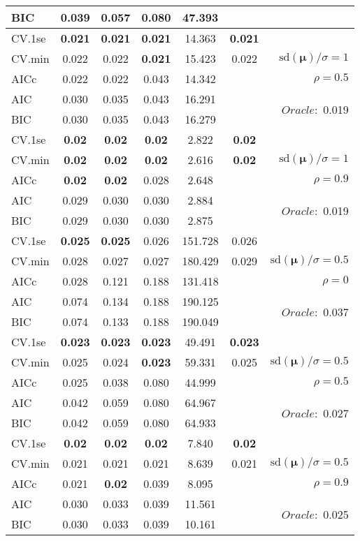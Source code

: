 \begin{table}
\begin{center}
\begin{tabular}{l*{5}{c}|r}
BIC & 0.039 & 0.057 & 0.080 & 47.393 & &  \\
 \hline 
CV.1se & {\bf 0.021} & {\bf 0.021} & {\bf 0.021} & 14.363 & {\bf 0.021} & \\
CV.min & 0.022 & 0.022 & {\bf 0.021} & 15.423 & 0.022 &  $\mathrm{sd}(\mathbf{\mu})/\sigma=1$ \\
AICc & 0.022 & 0.022 & 0.043 & 14.342 & & $\rho=0.5$ \\
AIC & 0.030 & 0.035 & 0.043 & 16.291 & &  \multirow{2}{*}{$Oracle: $ 0.019} \\
BIC & 0.030 & 0.035 & 0.043 & 16.279 & &  \\
 \hline 
CV.1se & {\bf 0.02} & {\bf 0.02} & {\bf 0.02} & 2.822 & {\bf 0.02} & \\
CV.min & {\bf 0.02} & {\bf 0.02} & {\bf 0.02} & 2.616 & {\bf 0.02} &  $\mathrm{sd}(\mathbf{\mu})/\sigma=1$ \\
AICc & {\bf 0.02} & {\bf 0.02} & 0.028 & 2.648 & & $\rho=0.9$ \\
AIC & 0.029 & 0.030 & 0.030 & 2.884 & &  \multirow{2}{*}{$Oracle: $ 0.019} \\
BIC & 0.029 & 0.030 & 0.030 & 2.875 & &  \\
 \hline 
CV.1se & {\bf 0.025} & {\bf 0.025} & 0.026 & 151.728 & 0.026 & \\
CV.min & 0.028 & 0.027 & 0.027 & 180.429 & 0.029 &  $\mathrm{sd}(\mathbf{\mu})/\sigma=0.5$ \\
AICc & 0.028 & 0.121 & 0.188 & 131.418 & & $\rho=0$ \\
AIC & 0.074 & 0.134 & 0.188 & 190.125 & &  \multirow{2}{*}{$Oracle: $ 0.037} \\
BIC & 0.074 & 0.133 & 0.188 & 190.049 & &  \\
 \hline 
CV.1se & {\bf 0.023} & {\bf 0.023} & {\bf 0.023} & 49.491 & {\bf 0.023} & \\
CV.min & 0.025 & 0.024 & {\bf 0.023} & 59.331 & 0.025 &  $\mathrm{sd}(\mathbf{\mu})/\sigma=0.5$ \\
AICc & 0.025 & 0.038 & 0.080 & 44.999 & & $\rho=0.5$ \\
AIC & 0.042 & 0.059 & 0.080 & 64.967 & &  \multirow{2}{*}{$Oracle: $ 0.027} \\
BIC & 0.042 & 0.059 & 0.080 & 64.933 & &  \\
 \hline 
CV.1se & {\bf 0.02} & {\bf 0.02} & {\bf 0.02} & 7.840 & {\bf 0.02} & \\
CV.min & 0.021 & 0.021 & 0.021 & 8.639 & 0.021 &  $\mathrm{sd}(\mathbf{\mu})/\sigma=0.5$ \\
AICc & 0.021 & {\bf 0.02} & 0.039 & 8.095 & & $\rho=0.9$ \\
AIC & 0.030 & 0.033 & 0.039 & 11.561 & &  \multirow{2}{*}{$Oracle: $ 0.025} \\
BIC & 0.030 & 0.033 & 0.039 & 10.161 & &  \\
 \hline 
\end{tabular}
\end{center}
\vspace{-1cm}
\end{table}




